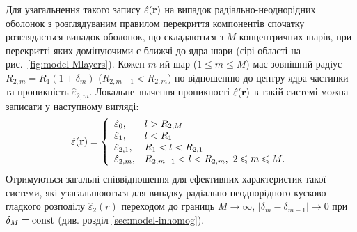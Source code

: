 \documentclass[14pt,twoside]{vakthesis}
\begin{document}
Для узагальнення такого запису $\hat{\varepsilon} ({\bf r})$ на випадок радіально-неоднорідних оболонок з розглядуваним правилом перекриття компонентів спочатку розглядається випадок оболонок, що складаються з  $M$ концентричних шарів, при перекритті яких домінуючими є ближчі до ядра шари (сірі області на рис.~\ref{fig:model-Mlayers}).
Кожен $m$-ий шар ($1 \leq m \leq M$) має зовнішній радіус $R_{2,m} = R_1(1 + \delta_m)$ ($R_{2,m-1}<R_{2,m}$) по відношенню до центру ядра частинки  та проникність $\hat{\varepsilon}_{2,m}$. Локальне значення проникності $\hat{\varepsilon} ({\bf r})$ в такій системі можна записати у наступному вигляді:
\begin{equation}\label{eq:local-perm-Mlayer}
\hat{\varepsilon} ({\bf r}) = \left\{ 
\begin{array}{ll}
\hat{\varepsilon}_0, & l > R_{2,M}\\
\hat{\varepsilon}_1, & l < R_1\\
\hat{\varepsilon}_{2,1}, & R_1 < l < R_{2,1}\\
\hat{\varepsilon}_{2,m}, & R_{2,m-1} < l < R_{2,m},\,\, 2 \leq m \leq M.
\end{array}
\right.
\end{equation}
Отримуються загальні співвідношення для ефективних характеристик такої системи, які узагальнюються для випадку радіально-неоднорідного кусково-гладкого розподілу $\hat{\varepsilon}_2(r)$ переходом до границь $M \to \infty$, $|\delta_{m} - \delta_{m-1}| \to 0$ при $\delta_M = {\rm const}$ (див. розділ \ref{sec:model-inhomog}).

\end{document}
